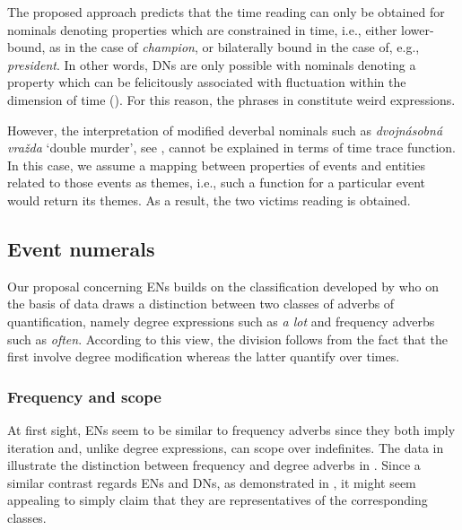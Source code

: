 \documentclass[output=paper,modfonts,hidelinks,newtxmath
\ChapterDOI{10.5281/zenodo.2545513}
]{langscibook}
\begin{document}
The proposed approach predicts that the time reading can only be obtained for nominals denoting properties which are constrained in time, i.e., either lower-bound, as in the case of \textit{champion}, or bilaterally bound in the case of, e.g., \textit{president}. In other words,  DNs are only possible with nominals denoting a property which can be felicitously associated with fluctuation within the dimension of time (\citealt{wagiel2015multiplicative}). For this reason, the phrases in  constitute weird expressions.

\z

\noindent However, the interpretation of modified deverbal nominals such as \textit{dvojnásobná vražda} `double murder', see , cannot be explained in terms of time trace function. In this case, we assume a mapping between properties of events and entities related to those events as themes, i.e., such a function for a particular event would return its themes. As a result, the two victims reading is obtained.

\subsection{Event numerals}\label{event-numerals}

Our proposal concerning ENs builds on the classification developed by \cite{doetjes_adverbs_2007} who on the basis of  data draws a distinction between two classes of adverbs of quantification, namely degree expressions such as \textit{a lot} and frequency adverbs such as \textit{often}. According to this view, the division follows from the fact that the first involve degree modification whereas the latter quantify over times. 

\subsubsection{Frequency and scope}\label{frequency-and-scope}

At first sight, ENs seem to be similar to frequency adverbs since they both imply iteration and, unlike degree expressions, can scope over indefinites. The data in  illustrate the distinction between frequency and degree adverbs in . Since a similar contrast regards ENs and DNs, as demonstrated in , it might seem appealing to simply claim that they are representatives of the corresponding classes.
\end{document}
